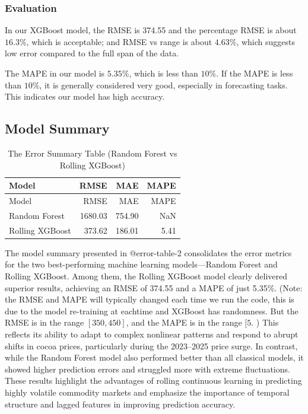 \documentclass[
  letterpaper,
  DIV=11,
  numbers=noendperiod]{scrartcl}
\begin{document}
\hypertarget{evaluation}{%
\subsubsection{Evaluation}\label{evaluation}}

In our XGBoost model, the RMSE is 374.55 and the percentage RMSE is
about \(16.3\%\), which is acceptable; and RMSE vs range is about
\(4.63\%\), which suggests low error compared to the full span of the
data.

The MAPE in our model is \(5.35\%\), which is less than \(10 \%\). If
the MAPE is less than \(10\%\), it is generally considered very good,
especially in forecasting tasks. This indicates our model has high
accuracy.

\hypertarget{model-summary}{%
\subsection{Model Summary}\label{model-summary}}

\begin{longtable}[]{@{}lrrr@{}}
\caption{The Error Summary Table (Random Forest vs Rolling XGBoost)
}\tabularnewline
\toprule()
Model & RMSE & MAE & MAPE \\
\midrule()
\endfirsthead
\toprule()
Model & RMSE & MAE & MAPE \\
\midrule()
\endhead
Random Forest & 1680.03 & 754.90 & NaN \\
Rolling XGBoost & 373.62 & 186.01 & 5.41 \\
\bottomrule()
\end{longtable}

The model summary presented in @error-table-2 consolidates the error
metrics for the two best-performing machine learning models---Random
Forest and Rolling XGBoost. Among them, the Rolling XGBoost model
clearly delivered superior results, achieving an RMSE of 374.55 and a
MAPE of just 5.35\%. (Note: the RMSE and MAPE will typically changed
each time we run the code, this is due to the model re-training at
eachtime and XGBoost has randomness. But the RMSE is in the range
\([350, 450]\), and the MAPE is in the range \([5%
\). ) This reflects its ability to adapt to complex nonlinear patterns
and respond to abrupt shifts in cocoa prices, particularly during the
2023--2025 price surge. In contrast, while the Random Forest model also
performed better than all classical models, it showed higher prediction
errors and struggled more with extreme fluctuations. These results
highlight the advantages of rolling continuous learning in predicting
highly volatile commodity markets and emphasize the importance of
temporal structure and lagged features in improving prediction accuracy.
\end{document}
